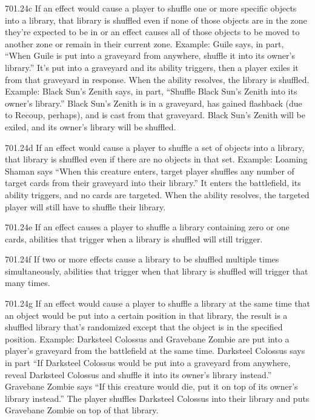 701.24c If an effect would cause a player to shuffle one or more specific objects into a library, that library is shuffled even if none of those objects are in the zone they’re expected to be in or an effect causes all of those objects to be moved to another zone or remain in their current zone.
Example: Guile says, in part, “When Guile is put into a graveyard from anywhere, shuffle it into its owner’s library.” It’s put into a graveyard and its ability triggers, then a player exiles it from that graveyard in response. When the ability resolves, the library is shuffled.
Example: Black Sun’s Zenith says, in part, “Shuffle Black Sun’s Zenith into its owner’s library.” Black Sun’s Zenith is in a graveyard, has gained flashback (due to Recoup, perhaps), and is cast from that graveyard. Black Sun’s Zenith will be exiled, and its owner’s library will be shuffled.

701.24d If an effect would cause a player to shuffle a set of objects into a library, that library is shuffled even if there are no objects in that set.
Example: Loaming Shaman says “When this creature enters, target player shuffles any number of target cards from their graveyard into their library.” It enters the battlefield, its ability triggers, and no cards are targeted. When the ability resolves, the targeted player will still have to shuffle their library.

701.24e If an effect causes a player to shuffle a library containing zero or one cards, abilities that trigger when a library is shuffled will still trigger.

701.24f If two or more effects cause a library to be shuffled multiple times simultaneously, abilities that trigger when that library is shuffled will trigger that many times.

701.24g If an effect would cause a player to shuffle a library at the same time that an object would be put into a certain position in that library, the result is a shuffled library that’s randomized except that the object is in the specified position.
Example: Darksteel Colossus and Gravebane Zombie are put into a player’s graveyard from the battlefield at the same time. Darksteel Colossus says in part “If Darksteel Colossus would be put into a graveyard from anywhere, reveal Darksteel Colossus and shuffle it into its owner’s library instead.” Gravebane Zombie says “If this creature would die, put it on top of its owner’s library instead.” The player shuffles Darksteel Colossus into their library and puts Gravebane Zombie on top of that library.

